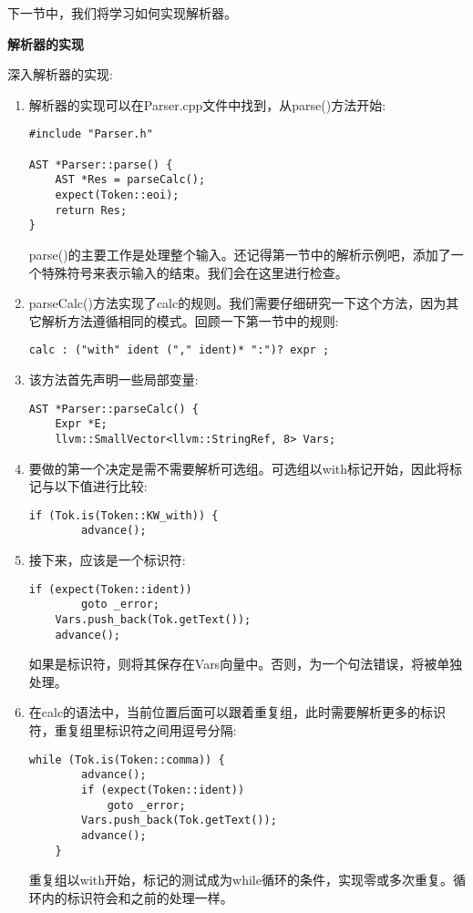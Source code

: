 下一节中，我们将学习如何实现解析器。\par

\hspace*{\fill} \par %
\textbf{解析器的实现}

深入解析器的实现:\par

\begin{enumerate}
\item 解析器的实现可以在Parser.cpp文件中找到，从parse()方法开始:
\begin{lstlisting}[caption={}]
#include "Parser.h"

AST *Parser::parse() {
	AST *Res = parseCalc();
	expect(Token::eoi);
	return Res;
}
\end{lstlisting}
parse()的主要工作是处理整个输入。还记得第一节中的解析示例吧，添加了一个特殊符号来表示输入的结束。我们会在这里进行检查。

\item parseCalc()方法实现了calc的规则。我们需要仔细研究一下这个方法，因为其它解析方法遵循相同的模式。回顾一下第一节中的规则:
\begin{lstlisting}[caption={}]
calc : ("with" ident ("," ident)* ":")? expr ;
\end{lstlisting}

\item 该方法首先声明一些局部变量:
\begin{lstlisting}[caption={}]
AST *Parser::parseCalc() {
	Expr *E;
	llvm::SmallVector<llvm::StringRef, 8> Vars;
\end{lstlisting}

\item 要做的第一个决定是需不需要解析可选组。可选组以with标记开始，因此将标记与以下值进行比较:
\begin{lstlisting}[caption={}]
	if (Tok.is(Token::KW_with)) {
		advance();
\end{lstlisting}

\item 接下来，应该是一个标识符:
\begin{lstlisting}[caption={}]
	if (expect(Token::ident))
		goto _error;
	Vars.push_back(Tok.getText());
	advance();
\end{lstlisting}
如果是标识符，则将其保存在Vars向量中。否则，为一个句法错误，将被单独处理。

\item 在calc的语法中，当前位置后面可以跟着重复组，此时需要解析更多的标识符，重复组里标识符之间用逗号分隔:
\begin{lstlisting}[caption={}]
	while (Tok.is(Token::comma)) {
		advance();
		if (expect(Token::ident))
			goto _error;
		Vars.push_back(Tok.getText());
		advance();
	}
\end{lstlisting}
重复组以with开始，标记的测试成为while循环的条件，实现零或多次重复。循环内的标识符会和之前的处理一样。


\end{enumerate}
